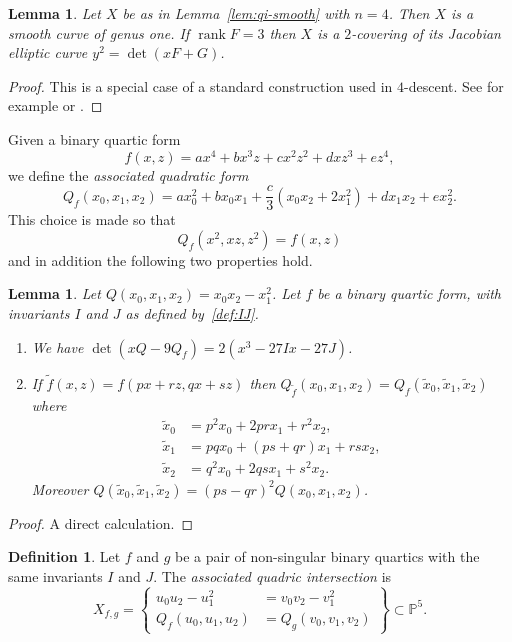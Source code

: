 \documentclass[12pt]{amsart}
\newcommand{\rank}{\operatorname{rank}}
\newcommand{\PP}{{\mathbb P}}
\newtheorem{Lemma}[Proposition]{Lemma}
\theoremstyle{definition}
\newtheorem{Definition}[Proposition]{Definition}
\begin{document}
\begin{Lemma}
  \label{lem:qi-jac}
  Let $X$ be as in Lemma~\ref{lem:qi-smooth} with $n=4$. Then $X$ is a
  smooth curve of genus one. If $\rank F = 3$ then $X$ is a
  $2$-covering of its Jacobian elliptic curve $y^2 = \det(xF + G)$.
\end{Lemma}

\begin{proof}
  This is a special case of a standard construction used in $4$-descent.
  See for example \cite{AKM3P} or \cite{4desc}.
\end{proof}

Given a binary quartic form
\begin{equation*}
f(x,z) = a x^4 + b x^3 z + c x^2 z^2 + d x z^3 + e z^4,
\end{equation*}
we define the {\em associated quadratic form}
\begin{equation*}
Q_f(x_0,x_1,x_2) = a x_0^2 + b x_0 x_1
  + \frac{c}{3} (x_0 x_2 + 2 x_1^2) + d x_1 x_2 + e x_2^2.
\end{equation*}
This choice is made so that
\[ Q_f(x^2,xz,z^2) = f(x,z) \]
and in addition the following two properties hold.

\begin{Lemma}
  \label{lem:first-props}
  Let $Q(x_0,x_1,x_2) = x_0 x_2 - x_1^2$. Let $f$ be a binary quartic
  form, with invariants $I$ and $J$ as defined by~\eqref{def:IJ}.
  \begin{enumerate} \item
    We have $\det(x Q - 9 Q_f) = 2(x^3 - 27 I x - 27 J)$.
  \item If $\widetilde{f}(x,z) = f(px + rz,qx+sz)$ then
    $Q_{\widetilde{f}}(x_0,x_1,x_2)
    =  Q_f(\widetilde{x}_0,\widetilde{x}_1,\widetilde{x}_2)$
    where
    \begin{align*}
    \widetilde{x}_0 &= p^2 x_0 + 2pr x_1 + r^2 x_2, \\
    \widetilde{x}_1 &=  pq x_0 + (ps +qr) x_1 + rs x_2, \\
    \widetilde{x}_2 &=  q^2 x_0 + 2qs x_1 + s^2 x_2.
    \end{align*}
    Moreover $ Q(\widetilde{x}_0,\widetilde{x}_1,\widetilde{x}_2)
    = (ps - qr)^2 Q(x_0,x_1,x_2)$.
\end{enumerate}
\end{Lemma}
\begin{proof}
  A direct calculation.
\end{proof}

\begin{Definition}
  \label{def:Xfg}
  Let $f$ and $g$ be a pair of non-singular binary quartics with
  the same invariants $I$ and $J$. The {\em associated quadric
  intersection} is 
\[ X_{f,g} = \left\{ \begin{aligned} u_0 u_2 - u_1^2 &= v_0 v_2 - v_1^2 \\
Q_f(u_0,u_1,u_2) &= Q_g(v_0,v_1,v_2) \end{aligned} \right\} \subset \PP^5. \]
\end{Definition}
\end{document}
